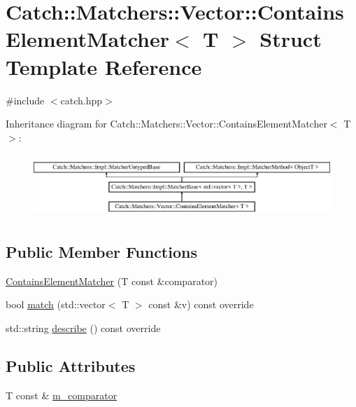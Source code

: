\hypertarget{structCatch_1_1Matchers_1_1Vector_1_1ContainsElementMatcher}{}\section{Catch\+:\+:Matchers\+:\+:Vector\+:\+:Contains\+Element\+Matcher$<$ T $>$ Struct Template Reference}
\label{structCatch_1_1Matchers_1_1Vector_1_1ContainsElementMatcher}


{\ttfamily \#include $<$catch.\+hpp$>$}

Inheritance diagram for Catch\+:\+:Matchers\+:\+:Vector\+:\+:Contains\+Element\+Matcher$<$ T $>$\+:\begin{figure}[H]
\begin{center}
\leavevmode
\includegraphics[height=2.400000cm]{structCatch_1_1Matchers_1_1Vector_1_1ContainsElementMatcher}
\end{center}
\end{figure}
\subsection*{Public Member Functions}
\begin{DoxyCompactItemize}
\item 
\mbox{\hyperlink{structCatch_1_1Matchers_1_1Vector_1_1ContainsElementMatcher_a6a05740b5d3f89fac8de84ac0cff7b93}{Contains\+Element\+Matcher}} (T const \&comparator)
\item 
bool \mbox{\hyperlink{structCatch_1_1Matchers_1_1Vector_1_1ContainsElementMatcher_a6a4be6e5642e267433d370649beb0fac}{match}} (std\+::vector$<$ T $>$ const \&v) const override
\item 
std\+::string \mbox{\hyperlink{structCatch_1_1Matchers_1_1Vector_1_1ContainsElementMatcher_aea3b674389a0afd82af6ba4b10f86ae6}{describe}} () const override
\end{DoxyCompactItemize}
\subsection*{Public Attributes}
\begin{DoxyCompactItemize}
\item 
T const  \& \mbox{\hyperlink{structCatch_1_1Matchers_1_1Vector_1_1ContainsElementMatcher_ab7eada6c4bbce1d21b44773262f9cb23}{m\+\_\+comparator}}
\end{DoxyCompactItemize}
